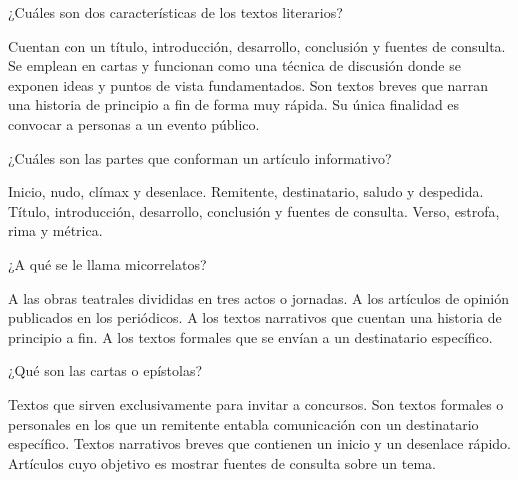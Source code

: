 \documentclass[12pt]{evaluasep}
\begin{document}
\begin{questions}
\begin{choices}
    \end{choices}
                
\newpage
    \question ¿Cuáles son dos características de los textos literarios?
    
    \begin{choices}
        \choice Cuentan con un título, introducción, desarrollo, conclusión y fuentes de consulta.
        \CorrectChoice Se emplean en cartas y funcionan como una técnica de discusión donde se exponen ideas y puntos de vista fundamentados.
        \choice Son textos breves que narran una historia de principio a fin de forma muy rápida.
        \choice Su única finalidad es convocar a personas a un evento público.
    
    \end{choices}
    

    \question ¿Cuáles son las partes que conforman un artículo informativo?
    
    \begin{choices}
        \choice Inicio, nudo, clímax y desenlace.
        \choice Remitente, destinatario, saludo y despedida.
        \CorrectChoice Título, introducción, desarrollo, conclusión y fuentes de consulta.
        \choice Verso, estrofa, rima y métrica.
    
    \end{choices}
    

    \question ¿A qué se le llama micorrelatos?
    
    \begin{choices}
        \choice A las obras teatrales divididas en tres actos o jornadas.
        \choice A los artículos de opinión publicados en los periódicos.
        \CorrectChoice A los textos narrativos que cuentan una historia de principio a fin.
        \choice A los textos formales que se envían a un destinatario específico.
    
    \end{choices}
    

    \question ¿Qué son las cartas o epístolas?
    
    \begin{choices}
        \choice Textos que sirven exclusivamente para invitar a concursos.
        \CorrectChoice Son textos formales o personales en los que un remitente entabla comunicación con un destinatario específico.
        \choice Textos narrativos breves que contienen un inicio y un desenlace rápido.
        \choice Artículos cuyo objetivo es mostrar fuentes de consulta sobre un tema.
    

\end{choices}
\end{questions}
\end{document}
